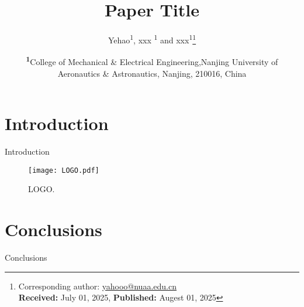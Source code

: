 \documentclass[
	letterpaper, %
	10pt, %
	unnumberedsections, %
	fleqn, %
]{styles/LTJournalArticle}
\title{Paper Title} %
\author{%
	Yehao\textsuperscript{1}, xxx \textsuperscript{1} and xxx\textsuperscript{1}\thanks{Corresponding author: \href{mailto:yahooo@nuaa.edu.cn}{yahooo@nuaa.edu.cn}\\ \textbf{Received:} July 01, 2025, \textbf{Published:} Augest 01, 2025}
}
\date{\footnotesize\textsuperscript{\textbf{1}}College of Mechanical \& Electrical Engineering,Nanjing University of Aeronautics \& Astronautics,  Nanjing, 210016, China}
\begin{document}
\maketitle %

\section{Introduction}
Introduction\cite{seemann_droplet_2012}

\begin{figure}[htbp]
	\centering
	\texttt{[image: LOGO.pdf]}
	\caption{LOGO.}
	\label{fig:SurfaceDiff}
\end{figure}

\section{Conclusions}
Conclusions







\newpage
\printbibliography%

\end{document}
